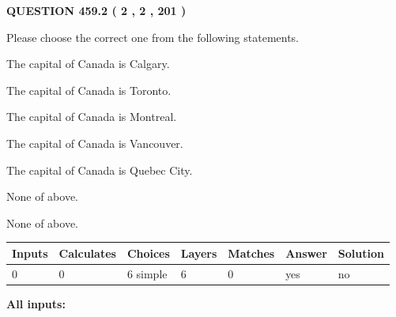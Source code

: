 \documentclass[12pt]{article}
\begin{document}
   
  
\vspace{0.2in}
  
{\textbf{\Large{QUESTION
459.2 
 ( 2 , 2 , 201 )
}}}
  
  
Please choose the correct one from the following statements.
 
 
The capital of Canada is Calgary.
 
 
The capital of Canada is Toronto.
 
 
The capital of Canada is Montreal.
 
 
The capital of Canada is Vancouver.
 
 
The capital of Canada is Quebec City.
 
 
 None of above.
 
 
\noindent{}
 
 
 None of above.
 
 
\noindent{}
 
 
   
   
   
   
\noindent\begin{tabular}{|l|l|l|l|l|l|l|}
 \hline
Inputs & Calculates & Choices & Layers & Matches & Answer & Solution \\ \hline
 0  & 
 0  & 
 6
  simple  
  & 
 6  & 
 0  & 
  yes & 
  no 
  \\ \hline
 \end{tabular}
   
   
   
   
\noindent{}
   
   
   
   
\noindent\vspace{0.1in}\hspace{-0.08in} {\textbf{\Large{All inputs: }}}
   
   
   
   
   
   
 \vspace{0.2in}
 
   
   
\end{document}
